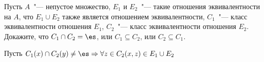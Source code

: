 \documentclass[11pt]{article}
\begin{document}
	\p Пусть $A$~"--- непустое множество,  $E_1$ и $E_2$~"---  такие отношения эквивалентности на $A$, что $E_1\cup E_2$ также является отношением эквивалентности, $C_1$~"--- класс эквивалентности отношения $E_1$, $C_2$~"--- класс эквивалентности отношения $E_2$. Докажите, что $C_1\cap C_2 = \es$, или $C_1\subseteq C_2$, или $C_2\subseteq C_1$.
	
	Пусть $C_1(x) \cap C_2(y) \neq \es \Rightarrow \forall z \in C_2 (x, z) \in E_1 \cup E_2$ 
\end{document}
